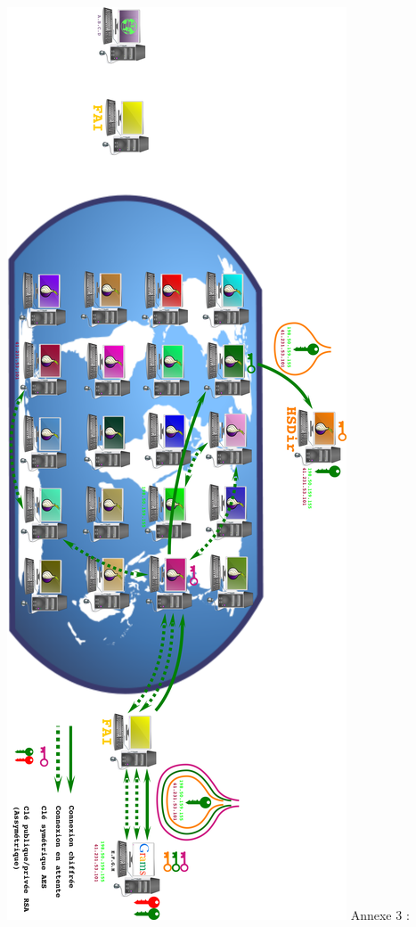 \documentclass[]{article}
\begin{document}
\includegraphics{images/Signalement_HSDir.png} Annexe 3 :
\end{document}
